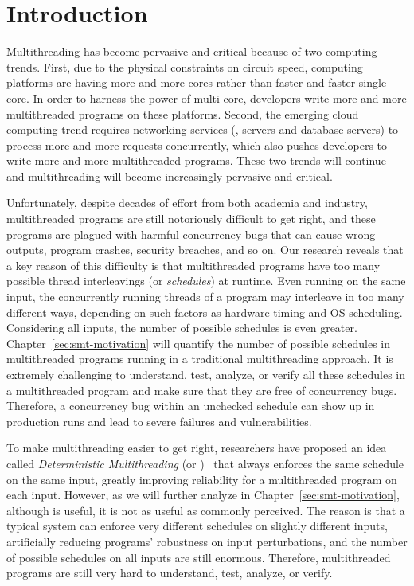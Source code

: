 \chapter{Introduction} \label{sec:intro}

Multithreading has become pervasive and critical because of two computing
trends. First, due to the physical constraints on circuit speed, computing
platforms are having more and more cores rather than faster and faster
single-core. In order to harness the power of multi-core, developers write more
and more multithreaded programs on these platforms. Second, the emerging cloud
computing trend requires networking services (\eg, \http servers and database
servers) to process more and more requests concurrently, which also pushes
developers to write more and more multithreaded programs. These two trends will
continue and multithreading will become increasingly pervasive and critical.

Unfortunately, despite decades of effort from both academia and industry,
multithreaded programs are still notoriously difficult to get right, and these
programs are plagued with harmful concurrency bugs that can cause wrong outputs,
program crashes, security breaches, and so on. Our research reveals that a key
reason of this difficulty is that multithreaded programs have too many
possible thread interleavings (or \emph{schedules}) at runtime. Even running on 
the same input, the concurrently running threads of a program may interleave in 
too many different ways, depending on such factors as hardware timing and OS
scheduling. Considering all inputs, the number of possible schedules is even
greater. Chapter~\ref{sec:smt-motivation} will quantify the number of
possible schedules in multithreaded programs running in a traditional
multithreading approach. It is extremely challenging to understand, test, 
analyze, or verify all these schedules in a multithreaded program and 
make sure that they are free of concurrency bugs. Therefore, a concurrency bug 
within an unchecked schedule can show up in production runs and lead to severe 
failures and vulnerabilities.

To make multithreading easier to get right, researchers have proposed an idea 
called \emph{Deterministic Multithreading} (or 
\emph{\dmt})~\cite{dthreads:sosp11, dpj:oopsla09, dmp:asplos09, kendo:asplos09, 
coredet:asplos10} that always enforces the same schedule on the same input, 
greatly improving reliability for a multithreaded program on each input. 
However, as we will further analyze in
Chapter~\ref{sec:smt-motivation}, although \dmt is useful, it is not as useful
as commonly perceived. The reason is that a typical \dmt system can enforce
very different schedules on slightly different inputs, artificially reducing
programs' robustness on input perturbations, and the number of possible
schedules on all inputs are still enormous. Therefore, multithreaded programs
are still very hard to understand, test, analyze, or verify.

